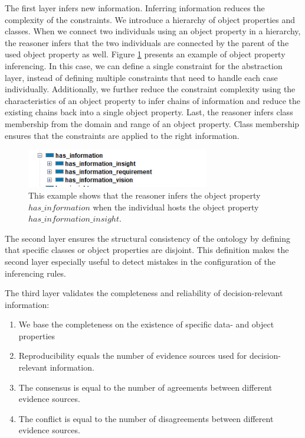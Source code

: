 The first layer infers new information. Inferring information reduces the complexity of the constraints. We introduce a hierarchy of object properties and classes. When we connect two individuals using an object property in a hierarchy, the reasoner infers that the two individuals are connected by the parent of the used object property as well. Figure \ref{fig:ifop} presents an example of object property inferencing. In this case, we can define a single constraint for the abstraction layer, instead of defining multiple constraints that need to handle each case individually. Additionally, we further reduce the constraint complexity using the characteristics of an object property to infer chains of information and reduce the existing chains back into a single object property. Last, the reasoner infers class membership from the domain and range of an object property. Class membership ensures that the constraints are applied to the right information.

\begin{figure}[H]
\centering
  \includegraphics[width=8cm]{../../Images/03_Methodology/03_Inferring_Object_Properties.png}
  \caption{This example shows that the reasoner infers the object property $has\_information$ when the individual hosts the object property $has\_information\_insight$.}
  \label{fig:ifop}
\end{figure}

The second layer ensures the structural consistency of the ontology by defining that specific classes or object properties are disjoint. This definition makes the second layer especially useful to detect mistakes in the configuration of the inferencing rules.

The third layer validates the completeness and reliability of decision-relevant information:
\begin{enumerate}
\item We base the completeness on the existence of specific data- and object properties
\item Reproducibility equals the number of evidence sources used for decision-relevant information.
\item The consensus is equal to the number of agreements between different evidence sources.
\item The conflict is equal to the number of disagreements between different evidence sources.
\end{enumerate}

